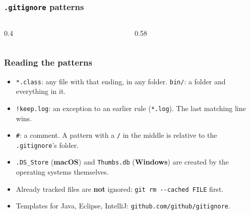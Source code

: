 \documentclass[aspectratio=169,10pt,compress]{beamer}
\newcommand{\win}{\textbf{Windows}}
\newcommand{\mac}{\textbf{macOS}}
\begin{document}




\begin{frame}[t,fragile] \frametitle{\texttt{.gitignore} patterns}
  \begin{columns}[T]
    \begin{column}{0.4\textwidth}
    \end{column}
    \begin{column}{0.58\textwidth}
    \end{column}
  \end{columns}
\end{frame}




\begin{frame}[t,fragile] \frametitle{Reading the patterns}
  \begin{itemize}
    \item \texttt{*.class}: any file with that ending, in any folder. \texttt{bin/}: a folder and everything in it.
    \item \texttt{!keep.log}: an exception to an earlier rule (\texttt{*.log}). The last matching line wins.
    \item \texttt{\#}: a comment. A pattern with a \texttt{/} in the middle is relative to the \texttt{.gitignore}'s folder.
    \item \texttt{.DS\_Store} (\mac) and \texttt{Thumbs.db} (\win) are created by the operating systems themselves.
    \item Already tracked files are \textbf{not} ignored: \texttt{git rm -{}-cached FILE} first.
    \item Templates for Java, Eclipse, IntelliJ: \texttt{github.com/github/gitignore}.
  \end{itemize}
\end{frame}

\end{document}

